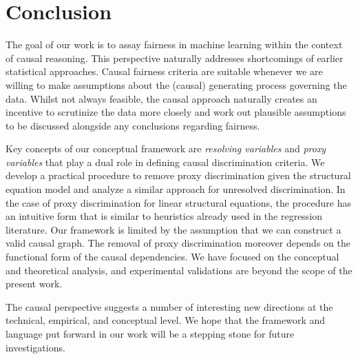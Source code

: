 \section{Conclusion}
\label{sec:conclusion}

The goal of our work is to assay fairness in machine learning within the context
of causal reasoning. This perspective naturally addresses shortcomings of
earlier statistical approaches. Causal fairness criteria are suitable whenever
we are willing to make assumptions about the (causal) generating process
governing the data.  Whilst not always feasible, the causal approach naturally
creates an incentive to scrutinize the data more closely and work out plausible
assumptions to be discussed alongside any conclusions regarding fairness.

Key concepts of our conceptual framework are \emph{resolving variables} and
\emph{proxy variables} that play a dual role in defining causal discrimination
criteria. We develop a practical procedure to remove proxy discrimination given
the structural equation model and analyze a similar approach for unresolved
discrimination. In the case of proxy discrimination for linear structural
equations, the procedure has an intuitive form that is similar to heuristics
already used in the regression literature. Our framework is limited by the
assumption that we can construct a valid causal graph. The removal of proxy
discrimination moreover depends on the functional form of the causal
dependencies. We have focused on the conceptual and theoretical analysis, and
experimental validations are beyond the scope of the present work.

The causal perspective suggests a number of interesting new directions at the
technical, empirical, and conceptual level. We hope that the framework and
language put forward in our work will be a stepping stone for future
investigations.
